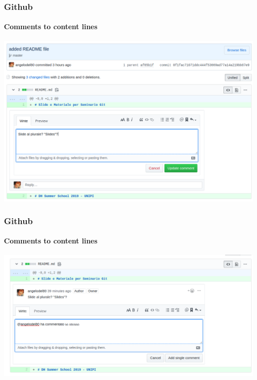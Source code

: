 \begin{frame}
		\frametitle{Github}
		\framesubtitle{Comments to content lines}
		\addtocounter{nframe}{1}
		
			\begin{center}
				\includegraphics[width=.95\textwidth]{imgs/github-Commento-codice.png}
			\end{center}

\end{frame}

\begin{frame}
	\frametitle{Github}
	\framesubtitle{Comments to content lines}
	\addtocounter{nframe}{1}
	
		\begin{center}
			\includegraphics[width=.95\textwidth]{imgs/github-CommentoNotifica.png}
		\end{center}

\end{frame}
	


